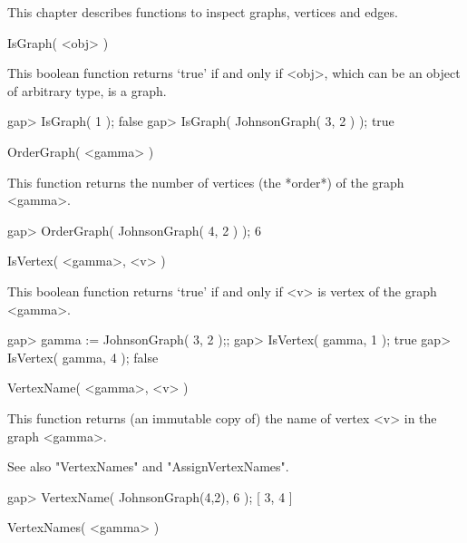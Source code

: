 %
%
%
%
\def\GRAPE{\sf GRAPE}
\def\nauty{\it nauty}
\def\G{\Gamma}
\def\Aut{{\rm Aut}\,}
\def\x{\times}

This chapter describes functions to inspect graphs, vertices and edges.


\>IsGraph( <obj> )

This boolean function  returns `true' if  and only if <obj>, which can be
an object of arbitrary type, is a graph.

\beginexample
gap> IsGraph( 1 );
false
gap> IsGraph( JohnsonGraph( 3, 2 ) );
true 
\endexample


\>OrderGraph( <gamma> )

This function returns the number of vertices (the *order*) of the graph
<gamma>.

\beginexample
gap> OrderGraph( JohnsonGraph( 4, 2 ) );
6 
\endexample


\>IsVertex( <gamma>, <v> )

This  boolean  function returns `true' if  and  only if  <v> is vertex of
the graph <gamma>.

\beginexample
gap> gamma := JohnsonGraph( 3, 2 );;
gap> IsVertex( gamma, 1 );
true
gap> IsVertex( gamma, 4 );
false 
\endexample


\>VertexName( <gamma>, <v> )

This function returns (an immutable copy of) the name of vertex <v> in
the graph <gamma>. 

See also "VertexNames" and "AssignVertexNames".

\beginexample
gap> VertexName( JohnsonGraph(4,2), 6 );
[ 3, 4 ] 
\endexample


\>VertexNames( <gamma> )

